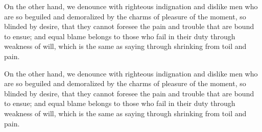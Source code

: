 On the other hand, we denounce with righteous indignation and dislike men who
are so beguiled and demoralized by the charms of pleasure of the moment, so
blinded by desire, that they cannot foresee the pain and trouble that are bound
to ensue; and equal blame belongs to those who fail in their duty through
weakness of will, which is the same as saying through shrinking from toil and
pain.

On the other hand, we denounce with righteous indignation and dislike men who
are so beguiled and demoralized by the charms of pleasure of the moment, so
blinded by desire, that they cannot foresee the pain and trouble that are bound
to ensue; and equal blame belongs to those who fail in their duty through
weakness of will, which is the same as saying through shrinking from toil and
pain.
